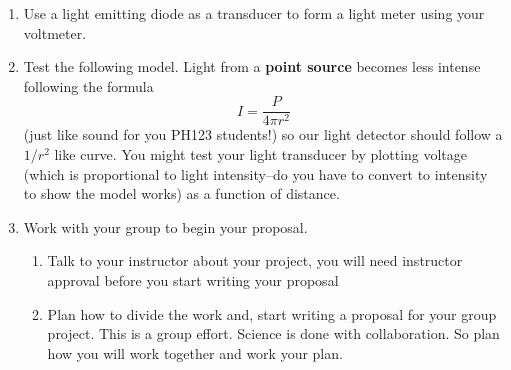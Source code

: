 \begin{enumerate}
	\item Use a light emitting diode as a transducer to form a light meter using
	your voltmeter.
	
	\item Test the following model. Light from a \textbf{point source} becomes
	less intense following the formula%
	\begin{equation*}
		I=\frac{P}{4\pi r^{2}}
	\end{equation*}%
	(just like sound for you PH123 students!) so our light detector should
	follow a $1/r^{2}$ like curve. You might test your light transducer by
	plotting voltage (which is proportional to light intensity--do you have to
	convert to intensity to show the model works) as a function of distance.
	
	\item Work with your group to begin your proposal.
	
	\begin{enumerate}
		\item Talk to your instructor about your project, you will need instructor
		approval before you start writing your proposal
		
		\item Plan how to divide the work and, start writing a proposal for your
		group project. This is a group effort. Science is done with collaboration.
		So plan how you will work together and work your plan.
	\end{enumerate}
\end{enumerate}

\vfill%
